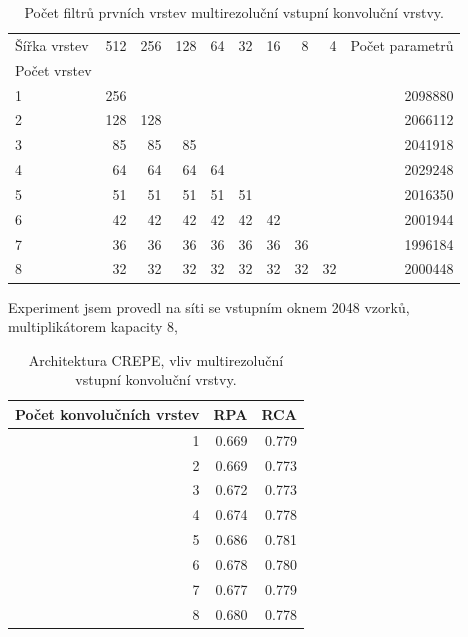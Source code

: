 \begin{table}[h!]
\centering
    \begin{tabular}{lrrrrrrrrr}
    \toprule
    Šířka vrstev & 512 & 256 & 128 & 64 & 32 & 16 & 8  & 4  & Počet parametrů  \\
    Počet vrstev & {} & {} & {} & {} & {} & {} & {}  & {}  & {}  \\
    \midrule
    1                   & 256 &     &     &    &    &    &    &    & 2098880 \\
    2                   & 128 & 128 &     &    &    &    &    &    & 2066112 \\
    3                   & 85  & 85  & 85  &    &    &    &    &    & 2041918 \\
    4                   & 64  & 64  & 64  & 64 &    &    &    &    & 2029248 \\
    5                   & 51  & 51  & 51  & 51 & 51 &    &    &    & 2016350 \\
    6                   & 42  & 42  & 42  & 42 & 42 & 42 &    &    & 2001944 \\
    7                   & 36  & 36  & 36  & 36 & 36 & 36 & 36 &    & 1996184 \\
    8                   & 32  & 32  & 32  & 32 & 32 & 32 & 32 & 32 & 2000448 \\
    \bottomrule
    \end{tabular}
\caption{Počet filtrů prvních vrstev multirezoluční vstupní konvoluční vrstvy.}\label{tab:crepe_velikosti_multirozliseni}
\end{table}

Experiment jsem provedl na síti se vstupním oknem 2048 vzorků, multiplikátorem kapacity 8, 

\begin{table}[h!]
\centering
    \begin{tabular}{rrr}
    \toprule
    Počet konvolučních vrstev &   RPA &   RCA \\
    \midrule
                            1 & 0.669 & 0.779 \\
                            2 & 0.669 & 0.773 \\
                            3 & 0.672 & 0.773 \\
                            4 & 0.674 & 0.778 \\
                            5 & 0.686 & 0.781 \\
                            6 & 0.678 & 0.780 \\
                            7 & 0.677 & 0.779 \\
                            8 & 0.680 & 0.778 \\
    \bottomrule
    \end{tabular}
\caption{Architektura CREPE, vliv multirezoluční vstupní konvoluční vrstvy.}\label{tab:crepe_multirozliseni}
\end{table}

